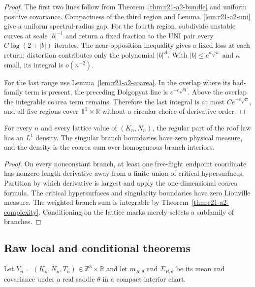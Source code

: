 \begin{proof}
The first two lines follow from Theorem~\ref{thm:r21-a2-bundle} and uniform
positive covariance.  Compactness of the third region and
Lemma~\ref{lem:r21-a2-uni} give a uniform spectral-radius gap.  For the fourth
region, subdivide unstable curves at scale $|b|^{-1}$ and return a fixed
fraction to the UNI pair every $C\log(2+|b|)$ iterates.  The near-opposition
inequality gives a fixed loss at each return; distortion contributes only the
polynomial $|b|^A$.  With $|b|\le e^{\kappa\sqrt n}$ and $\kappa$ small, its
integral is $o(n^{-2})$.

For the last range use Lemma~\ref{lem:r21-a2-coarea}.  In the overlap where
its bad-family term is present, the preceding Dolgopyat line is
$e^{-c\sqrt n}$.  Above the overlap the integrable coarea term remains.
Therefore the last integral is at most $Ce^{-c\sqrt n}$, and all five regions
cover $\mathbb T^3\times\mathbb R$ without a circular choice of derivative
order.
\end{proof}

\begin{lemma}
\label{lem:r21-a2-density}
For every $n$ and every lattice value of $(K_n,N_n)$, the regular part of the
roof law has an $L^1$ density.  The singular branch boundaries have zero
physical measure, and the density is the coarea sum over homogeneous branch
interiors.
\end{lemma}

\begin{proof}
On every nonconstant branch, at least one free-flight endpoint coordinate has
nonzero length derivative away from a finite union of critical hypersurfaces.
Partition by which derivative is largest and apply the one-dimensional
coarea formula.  The critical hypersurfaces and singularity boundaries have
zero Liouville measure.  The weighted branch sum is integrable by
Theorem~\ref{thm:r21-a2-complexity}.  Conditioning on the lattice marks merely
selects a subfamily of branches.
\end{proof}

\subsection{Raw local and conditional theorems}

Let $Y_n=(K_n,N_n,T_n)\in\mathbb Z^3\times\mathbb R$ and let
$m_{R,\theta}$ and $\Sigma_{R,\theta}$ be its mean and covariance under a real
saddle $\theta$ in a compact interior chart.

